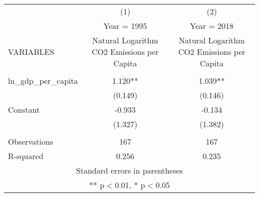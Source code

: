 \begin{tabular}{lcc} \hline
 & (1) & (2) \\
 & Year = 1995 & Year = 2018 \\
VARIABLES & Natural Logarithm CO2 Emissions per Capita & Natural Logarithm CO2 Emissions per Capita \\ \hline
 &  &  \\
ln\_gdp\_per\_capita & 1.120** & 1.039** \\
 & (0.149) & (0.146) \\
Constant & -0.933 & -0.134 \\
 & (1.327) & (1.382) \\
 &  &  \\
Observations & 167 & 167 \\
 R-squared & 0.256 & 0.235 \\ \hline
\multicolumn{3}{c}{ Standard errors in parentheses} \\
\multicolumn{3}{c}{ ** p$<$0.01, * p$<$0.05} \\
\end{tabular}
